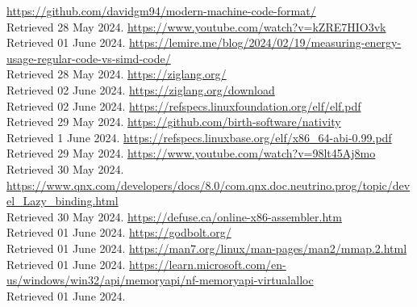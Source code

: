 \documentclass[12pt]{article}
\begin{document}
	\newpage
	\begin{thebibliography}{9}
		 \href{https://github.com/davidgm94/modern-machine-code-format/}{https://github.com/davidgm94/modern-machine-code-format/}\\
		Retrieved 28 May 2024.
		\href{https://www.youtube.com/watch?v=kZRE7HIO3vk}{https://www.youtube.com/watch?v=kZRE7HIO3vk}\\
		Retrieved 01 June 2024.
		\href{https://lemire.me/blog/2024/02/19/measuring-energy-usage-regular-code-vs-simd-code}{https://lemire.me/blog/2024/02/19/measuring-energy-usage-regular-code-vs-simd-code/}\\
		Retrieved 28 May 2024.
		\href{https://ziglang.org/}{https://ziglang.org/}\\
		Retrieved 02 June 2024.
		\href{https://ziglang.org/download}{https://ziglang.org/download}\\
		Retrieved 02 June 2024.
		\href{https://refspecs.linuxfoundation.org/elf/elf.pdf}{https://refspecs.linuxfoundation.org/elf/elf.pdf}\\
		Retrieved 29 May 2024.
		\href{https://github.com/birth-software/nativity}{https://github.com/birth-software/nativity}\\
		Retrieved 1 June 2024.
		\href{https://refspecs.linuxbase.org/elf/x86_64-abi-0.99.pdf}{https://refspecs.linuxbase.org/elf/x86\_64-abi-0.99.pdf}\\
		Retrieved 29 May 2024.
		\href{https://www.youtube.com/watch?v=98lt45Aj8mo}{https://www.youtube.com/watch?v=98lt45Aj8mo}\\
		Retrieved 30 May 2024.
		\href{https://www.qnx.com/developers/docs/8.0/com.qnx.doc.neutrino.prog/topic/devel_Lazy_binding.html}{https://www.qnx.com/developers/docs/8.0/com.qnx.doc.neutrino.prog/topic/devel\_Lazy\_binding.html}\\
		Retrieved 30 May 2024.
		\href{https://defuse.ca/online-x86-assembler.htm}{https://defuse.ca/online-x86-assembler.htm}\\
		Retrieved 01 June 2024.
		\href{https://godbolt.org/}{https://godbolt.org/}\\
		Retrieved 01 June 2024.
		\href{https://man7.org/linux/man-pages/man2/mmap.2.html}{https://man7.org/linux/man-pages/man2/mmap.2.html}\\
		Retrieved 01 June 2024.
		\href{https://learn.microsoft.com/en-us/windows/win32/api/memoryapi/nf-memoryapi-virtualalloc}{https://learn.microsoft.com/en-us/windows/win32/api/memoryapi/nf-memoryapi-virtualalloc}\\
		Retrieved 01 June 2024.
	\end{thebibliography}
\end{document}
